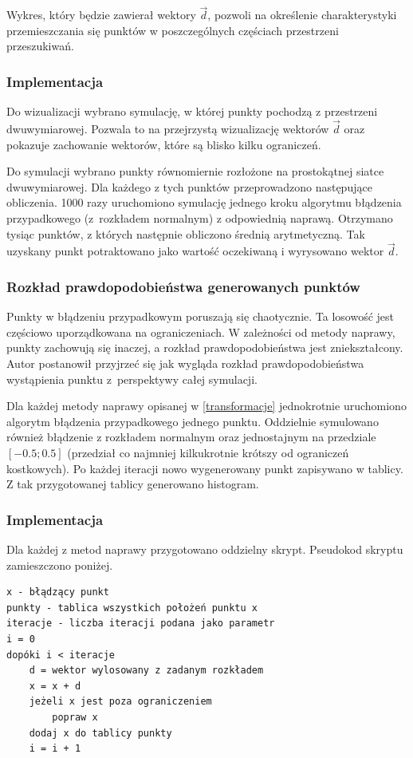 \documentclass{mini}
\begin{document}
Wykres, który będzie zawierał wektory $\overrightarrow{d}$, pozwoli na określenie charakterystyki przemieszczania się punktów w poszczególnych częściach przestrzeni przeszukiwań.

\subsubsection*{Implementacja}
Do wizualizacji wybrano symulację, w której punkty pochodzą z przestrzeni dwuwymiarowej. Pozwala to na przejrzystą wizualizację wektorów $\overrightarrow{d}$ oraz pokazuje zachowanie wektorów, które są blisko kilku ograniczeń.

Do symulacji wybrano punkty równomiernie rozłożone na prostokątnej siatce dwuwymiarowej. Dla każdego z tych punktów przeprowadzono następujące obliczenia. 1000 razy uruchomiono symulację jednego kroku algorytmu błądzenia przypadkowego (z~rozkładem normalnym) z odpowiednią naprawą. Otrzymano tysiąc punktów, z których następnie obliczono średnią arytmetyczną. Tak uzyskany punkt potraktowano jako wartość oczekiwaną i wyrysowano wektor $\overrightarrow{d}$.

\subsubsection{Rozkład prawdopodobieństwa generowanych punktów}
Punkty w błądzeniu przypadkowym poruszają się chaotycznie. Ta losowość jest częściowo uporządkowana na ograniczeniach. W zależności od metody naprawy, punkty zachowują się inaczej, a rozkład prawdopodobieństwa jest zniekształcony. Autor postanowił przyjrzeć się jak wygląda rozkład prawdopodobieństwa wystąpienia punktu z~perspektywy całej symulacji.

Dla każdej metody naprawy opisanej w \ref{transformacje} jednokrotnie uruchomiono algorytm błądzenia przypadkowego jednego punktu. Oddzielnie symulowano również błądzenie z rozkładem normalnym oraz jednostajnym na przedziale $[-0.5; 0.5]$ (przedział co najmniej kilkukrotnie krótszy od ograniczeń kostkowych). Po każdej iteracji nowo wygenerowany punkt zapisywano w tablicy. Z tak przygotowanej tablicy generowano histogram.

\subsubsection*{Implementacja}
Dla każdej z metod naprawy przygotowano oddzielny skrypt. Pseudokod skryptu zamieszczono poniżej.
\begin{Verbatim}[baselinestretch=1.1]
x - błądzący punkt
punkty - tablica wszystkich położeń punktu x
iteracje - liczba iteracji podana jako parametr
i = 0
dopóki i < iteracje
	d = wektor wylosowany z zadanym rozkładem
	x = x + d
	jeżeli x jest poza ograniczeniem
		popraw x
	dodaj x do tablicy punkty
	i = i + 1
\end{Verbatim}
\end{document}
